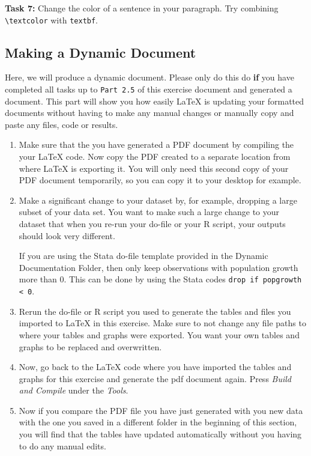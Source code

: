 \documentclass[12pts]{article}
\begin{document}
	\textcolor{BurntOrange}{\textbf{Task 7:}} Change the color of a sentence in your paragraph. Try combining \verb|\textcolor| with \verb|textbf|.
		
	
	\subsection{Making a Dynamic Document}
	
	Here, we will produce a dynamic document. Please only do this do \textbf{if} you have completed all tasks up to \texttt{Part 2.5} of this exercise document and generated a document. This part will show you how easily {\LaTeX} is updating your formatted documents without having to make any manual changes or manually copy and paste any files, code or results.
	
	\begin{enumerate}
		\item Make sure that the you have generated a PDF document by compiling the your {\LaTeX} code. Now copy the PDF created to a separate location from where {\LaTeX} is exporting it. You will only need this second copy of your PDF document temporarily, so you can copy it to your desktop for example. 
		\item Make a significant change to your dataset by, for example, dropping a large subset of your data set. You want to make such a large change to your dataset that when you re-run your do-file or your R script, your outputs should look very different.
		
		If you are using the Stata do-file template provided in the Dynamic Documentation Folder, then only keep observations with population growth more than 0. This can be done by using the Stata codes \texttt{drop if popgrowth < 0}. 
		\item Rerun the do-file or R script you used to generate the tables and files you imported to {\LaTeX} in this exercise. Make sure to not change any file paths to where your tables and graphs were exported. You want your own tables and graphs to be replaced and overwritten.
		\item Now, go back to the {\LaTeX} code where you have imported the tables and graphs for this exercise and generate the pdf document again. Press \textit{Build and Compile} under the \textit{Tools}.
		\item Now if you compare the PDF file you have just generated with you new data with the one you saved in a different folder in the beginning of this section, you will find that the tables have updated automatically without you having to do any manual edits. 
	\end{enumerate}
	
\end{document}
